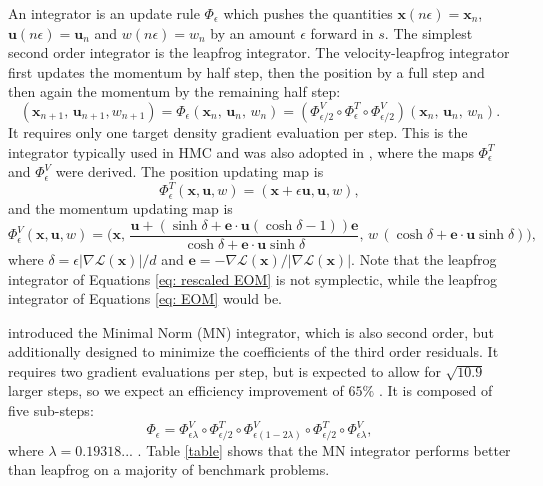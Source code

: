 \documentclass[twoside,11pt]{article}
\newcommand{\x}{\boldsymbol{x}}
\newcommand{\U}{\boldsymbol{u}}
\begin{document}
An integrator is an update rule $\Phi_{\epsilon}$ which pushes the quantities $\x(n \epsilon) = \x_n$, $\U(n \epsilon) = \U_n$ and $w(n \epsilon) = w_n$ by an amount $\epsilon$ forward in $s$.
The simplest second order integrator is the leapfrog integrator. The velocity-leapfrog integrator first updates the momentum by half step, then the position by a full step and then again the momentum by the remaining half step:
\begin{equation} \label{eq: leapfrog}
    (\x_{n+1},\, \U_{n+1}, w_{n+1}) = \Phi_{\epsilon}(\x_n, \, \U_n, \, w_n) = (\Phi_{\epsilon / 2}^{V} \circ \Phi_{\epsilon}^{T} \circ \Phi_{\epsilon / 2}^{V}) (\x_n, \, \U_n, \, w_n).
\end{equation}
It requires only one target density gradient evaluation per step. This is the integrator typically used in HMC and was also adopted in \cite{ESH}, where the maps $\Phi_{\epsilon}^T$ and $\Phi_{\epsilon}^V$ were derived. The position updating map is
\begin{equation} \label{eq: leapfrog position}
    \Phi^T_{\epsilon}(\x, \U, w) = (\x + \epsilon \U, \U, w),
\end{equation}
and the momentum updating map is
\begin{equation} \label{eq: leapfrog momentum}
    \Phi_{\epsilon}^V(\x, \U, w) = \bigg( \x, \,
    \frac{\U + (\sinh{\delta}+ \boldsymbol{e} \cdot \U (\cosh \delta -1)) \boldsymbol{e} }{\cosh{\delta} + \boldsymbol{e} \cdot \U \sinh{\delta}}, \,
    w \,(\cosh \delta + \boldsymbol{e} \cdot \U \sinh \delta) \bigg), 
\end{equation}
where $\delta = \epsilon \vert \nabla \mathcal{L}(\x) \vert / d$ and $ \boldsymbol{e} = - \nabla \mathcal{L}(\x) / \vert \nabla \mathcal{L}(\x) \vert$.
Note that the leapfrog integrator of Equations \eqref{eq: rescaled EOM} is not symplectic, while the leapfrog integrator of Equations \eqref{eq: EOM} would be.

\cite{MinimalNorm} introduced the Minimal Norm (MN) integrator, which is also second order, but additionally designed to minimize the coefficients of the third order residuals. It requires two gradient evaluations per step, but is expected to allow for $\sqrt{10.9}$ larger steps, so we expect an efficiency improvement of $65 \%$ \citep{MinimalNormQCD}. It is composed of five sub-steps:
\begin{equation}
    \Phi_{\epsilon} = \Phi_{\epsilon \lambda}^{V} \circ \Phi_{\epsilon/2}^{T}\circ \Phi_{\epsilon (1-2\lambda)}^{V} \circ \Phi_{\epsilon/2}^{T} \circ \Phi_{\epsilon \lambda}^{V},
\end{equation}
where $\lambda = 0.19318...$ \citep{MinimalNormQCD}. 
Table \ref{table} shows that the MN integrator performs better than leapfrog on a majority of benchmark problems.
\end{document}
